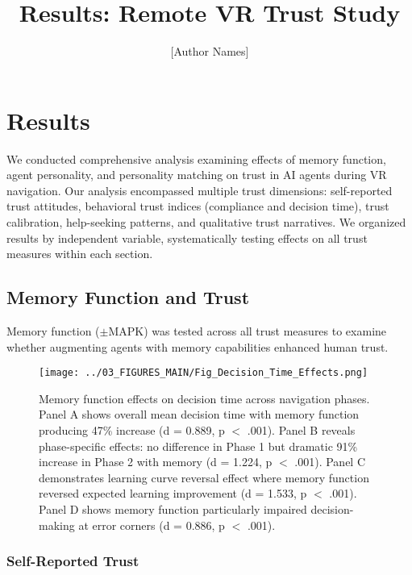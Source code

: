 \documentclass[12pt]{article}
\title{\textbf{Results: Remote VR Trust Study}}
\author{[Author Names]}
\date{}
\begin{document}
\maketitle

\section{Results}

We conducted comprehensive analysis examining effects of memory function, agent personality, and personality matching on trust in AI agents during VR navigation. Our analysis encompassed multiple trust dimensions: self-reported trust attitudes, behavioral trust indices (compliance and decision time), trust calibration, help-seeking patterns, and qualitative trust narratives. We organized results by independent variable, systematically testing effects on all trust measures within each section.

\subsection{Memory Function and Trust}

Memory function ($\pm$MAPK) was tested across all trust measures to examine whether augmenting agents with memory capabilities enhanced human trust.

\begin{figure}[h]
\centering
\texttt{[image: ../03\_FIGURES\_MAIN/Fig\_Decision\_Time\_Effects.png]}
\caption{Memory function effects on decision time across navigation phases. Panel A shows overall mean decision time with memory function producing 47\% increase (d = 0.889, p $<$ .001). Panel B reveals phase-specific effects: no difference in Phase 1 but dramatic 91\% increase in Phase 2 with memory (d = 1.224, p $<$ .001). Panel C demonstrates learning curve reversal effect where memory function reversed expected learning improvement (d = 1.533, p $<$ .001). Panel D shows memory function particularly impaired decision-making at error corners (d = 0.886, p $<$ .001).}
\label{fig:decision_time_effects}
\end{figure}

\subsubsection{Self-Reported Trust}
\end{document}
